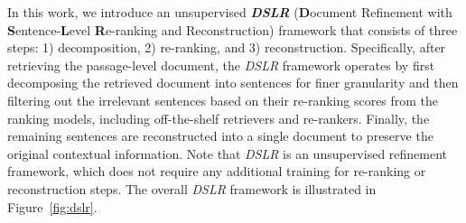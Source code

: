 In this work, we introduce an unsupervised \textbf{\textit{DSLR}} (\textbf{D}ocument Refinement with \textbf{S}entence-\textbf{L}evel \textbf{R}e-ranking and Reconstruction) framework that consists of three steps: 1) decomposition, 2) re-ranking, and 3) reconstruction.
Specifically, after retrieving the passage-level document, the \textit{DSLR} framework operates by first decomposing the retrieved document into sentences for finer granularity and then filtering out the irrelevant sentences based on their re-ranking scores from the ranking models, including off-the-shelf retrievers and re-rankers. 
Finally, the remaining sentences are reconstructed into a single document to preserve the original contextual information. 
Note that \textit{DSLR} is an unsupervised refinement framework, which does not require any additional training for re-ranking or reconstruction steps.
The overall \textit{DSLR} framework is illustrated in Figure~\ref{fig:dslr}.

